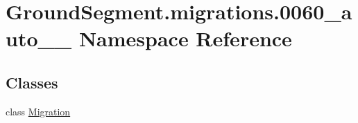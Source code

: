 \hypertarget{namespace_ground_segment_1_1migrations_1_10060__auto__20170401__1620}{}\section{Ground\+Segment.\+migrations.0060\+\_\+auto\+\_\+\_ Namespace Reference}
\label{namespace_ground_segment_1_1migrations_1_10060__auto__20170401__1620}
\subsection*{Classes}
\begin{DoxyCompactItemize}
\item 
class \hyperlink{class_ground_segment_1_1migrations_1_10060__auto__20170401__1620_1_1_migration}{Migration}
\end{DoxyCompactItemize}
